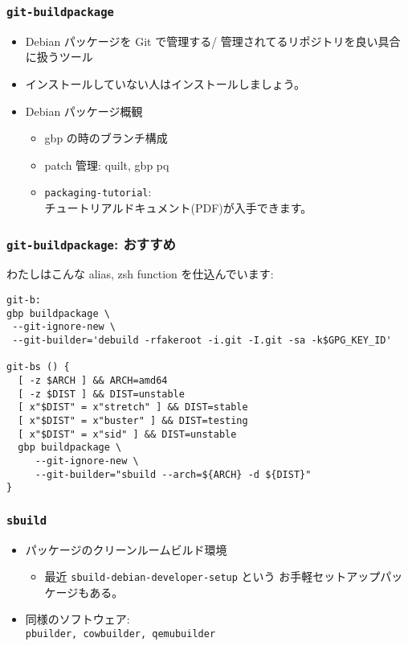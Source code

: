 \documentclass[cjk,dvipdfmx,14pt,compress,%
hyperref={bookmarks=true,bookmarksnumbered=true,bookmarksopen=false,%
colorlinks=false,%
pdftitle={第 134 回 関西 Debian 勉強会},%
pdfauthor={佐々木洋平},%
pdfsubject={資料},%
}]{beamer}
\begin{document}
\begin{frame}
  \frametitle{\texttt{git-buildpackage}}
  \begin{itemize}
  \item %
    Debian パッケージを Git で管理する/
    管理されてるリポジトリを良い具合に扱うツール
  \item %
    インストールしていない人はインストールしましょう。
  \item %
    Debian パッケージ概観
    \begin{itemize}
    \item gbp の時のブランチ構成
    \item patch 管理: quilt, gbp pq
    \item \texttt{packaging-tutorial}: \\チュートリアルドキュメント(PDF)が入手できます。
    \end{itemize}
  \end{itemize}
\end{frame}

\begin{frame}[fragile]
  \frametitle{\texttt{git-buildpackage}: おすすめ}
  わたしはこんな alias, zsh function を仕込んでいます:
  \footnotesize
\begin{verbatim}
git-b:
gbp buildpackage \
 --git-ignore-new \
 --git-builder='debuild -rfakeroot -i.git -I.git -sa -k$GPG_KEY_ID'

git-bs () {
  [ -z $ARCH ] && ARCH=amd64
  [ -z $DIST ] && DIST=unstable
  [ x"$DIST" = x"stretch" ] && DIST=stable
  [ x"$DIST" = x"buster" ] && DIST=testing
  [ x"$DIST" = x"sid" ] && DIST=unstable
  gbp buildpackage \
     --git-ignore-new \
     --git-builder="sbuild --arch=${ARCH} -d ${DIST}"
}
\end{verbatim}
\end{frame}

\begin{frame}
  \frametitle{\texttt{sbuild}}
  \begin{itemize}
  \item パッケージのクリーンルームビルド環境
    \begin{itemize}
    \item %
      最近 \texttt{sbuild-debian-developer-setup} という
      お手軽セットアップパッケージもある。
    \end{itemize}
  \item 同様のソフトウェア:\\
    \texttt{pbuilder, cowbuilder, qemubuilder}
  \end{itemize}
\end{frame}
\end{document}

